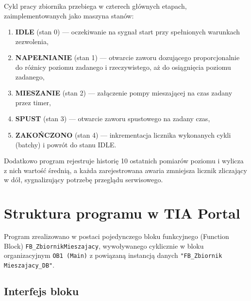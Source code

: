 \documentclass[12pt,a4paper]{report}
\begin{document}
Cykl pracy zbiornika przebiega w czterech głównych etapach, zaimplementowanych jako maszyna stanów:

\begin{enumerate}
    \item \textbf{IDLE} (stan 0) — oczekiwanie na sygnał start przy spełnionych warunkach zezwolenia,
    \item \textbf{NAPEŁNIANIE} (stan 1) — otwarcie zaworu dozującego proporcjonalnie do różnicy poziomu zadanego i rzeczywistego, aż do osiągnięcia poziomu zadanego,
    \item \textbf{MIESZANIE} (stan 2) — załączenie pompy mieszającej na czas zadany przez timer,
    \item \textbf{SPUST} (stan 3) — otwarcie zaworu spustowego na zadany czas,
    \item \textbf{ZAKOŃCZONO} (stan 4) — inkrementacja licznika wykonanych cykli (batchy) i powrót do stanu IDLE.
\end{enumerate}

Dodatkowo program rejestruje historię 10 ostatnich pomiarów poziomu i wylicza z nich wartość średnią, a każda zarejestrowana awaria zmniejsza licznik zliczający w dół, sygnalizujący potrzebę przeglądu serwisowego.

\chapter{Struktura programu w TIA Portal}

Program zrealizowano w postaci pojedynczego bloku funkcyjnego (Function Block) \texttt{FB\_ZbiornikMieszajacy}, wywoływanego cyklicznie w bloku organizacyjnym \texttt{OB1 (Main)} z powiązaną instancją danych \texttt{"FB\_Zbiornik Mieszajacy\_DB"}.

\section{Interfejs bloku}
\end{document}
